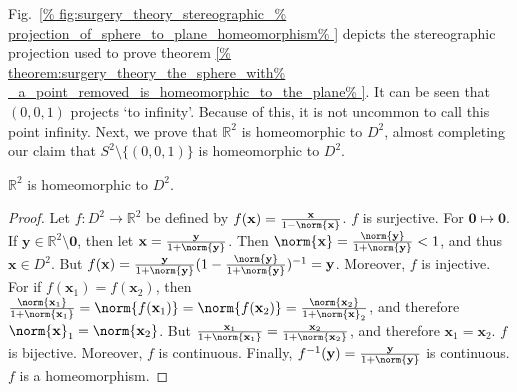 \documentclass[crop=false,class=book,oneside]{standalone}
\begin{document}
            Fig.~\ref{%
                fig:surgery_theory_stereographic_%
                projection_of_sphere_to_plane_homeomorphism%
            }
            depicts the stereographic projection used
            to prove theorem
            \ref{%
                theorem:surgery_theory_the_sphere_with%
                _a_point_removed_is_homeomorphic_to_the_plane%
            }.
            It can be seen that $(0,0,1)$ projects `to infinity'.
            Because of this, it is not uncommon to call this point
            infinity. Next, we prove that $\mathbb{R}^{2}$ is
            homeomorphic to $D^{2}$, almost completing our claim
            that $S^{2}\setminus\{(0,0,1)\}$
            is homeomorphic to $D^{2}$.
            \begin{theorem}
                $\mathbb{R}^{2}$ is homeomorphic to $D^{2}$.
            \end{theorem}
            \begin{proof}
                Let $f:D^{2}\rightarrow\mathbb{R}^{2}$
                be defined by
                $f(\mathbf{x})%
                 =\frac{\mathbf{x}}{1-\norm{\mathbf{x}}}$.
                $f$ is surjective.
                For $\mathbf{0}\mapsto\mathbf{0}$.
                If $\mathbf{y}\in\mathbb{R}^2\setminus\mathbf{0}$,
                then let
                $\mathbf{x}=\frac{\mathbf{y}}{1+\norm{\mathbf{y}}}$.
                Then
                $\norm{\mathbf{x}}%
                 =\frac{\norm{\mathbf{y}}}{1+\norm{\mathbf{y}}}<1$,
                and thus $\mathbf{x}\in D^{2}$.
                But
                $f(\mathbf{x})%
                 =\frac{\mathbf{y}}{1+\norm{\mathbf{y}}}%
                  (1-\frac{\norm{\mathbf{y}}}%
                          {1+\norm{\mathbf{y}}})^{-1}%
                 =\mathbf{y}$.
                Moreover, $f$ is injective.
                For if
                $f(\mathbf{x}_{1})=f(\mathbf{x}_{2})$,
                then
                $\frac{\norm{\mathbf{x}_{1}}}%
                 {1+\norm{\mathbf{x}_{1}}}%
                 =\norm{f(\mathbf{x}_{1})}%
                 =\norm{f(\mathbf{x}_{2})}%
                 =\frac{\norm{\mathbf{x}_{2}}}%
                  {1+\norm{\mathbf{x}}_{2}}$,
                and therefore
                $\norm{\mathbf{x}}_{1}=\norm{\mathbf{x}_{2}}$.
                But
                $\frac{\mathbf{x}_{1}}{1+\norm{\mathbf{x}_{1}}}%
                 =\frac{\mathbf{x}_{2}}{1+\norm{\mathbf{x}_{2}}}$,
                and therefore $\mathbf{x}_{1}=\mathbf{x}_{2}$.
                $f$ is bijective.
                Moreover, $f$ is continuous. Finally,
                $f^{-1}(\mathbf{y})%
                 =\frac{\mathbf{y}}{1+\norm{\mathbf{y}}}$
                is continuous. $f$ is a homeomorphism.
            \end{proof}
\end{document}
